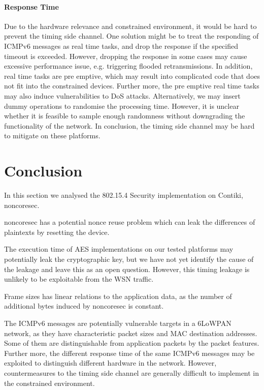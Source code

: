 \paragraph{Response Time}

Due to the hardware relevance and constrained environment, it would be hard to prevent the timing side channel. One solution might be to treat the responding of ICMPv6 messages as real time tasks, and drop the response if the specified timeout is exceeded. However, dropping the response in some cases may cause excessive performance issue, e.g. triggering flooded retransmissions. In addition, real time tasks are pre emptive, which may result into complicated code that does not fit into the constrained devices. Further more, the pre emptive real time tasks may also induce vulnerabilities to DoS attacks. Alternatively, we may insert dummy operations to randomise the processing time. However, it is unclear whether it is feasible to sample enough randomness without downgrading the functionality of the network. In conclusion, the timing side channel may be hard to mitigate on these platforms.


\section{Conclusion}

In this section we analysed the 802.15.4 Security implementation on Contiki, noncoresec.

noncoresec has a potential nonce reuse problem which can leak the differences of plaintexts by resetting the device.

The execution time of AES implementations on our tested platforms may potentially leak the cryptographic key, but we have not yet identify the cause of the leakage and leave this as an open question. However, this timing leakage is unlikely to be exploitable from the WSN traffic.

Frame sizes has linear relations to the application data, as the number of additional bytes induced by noncoresec is constant.

The ICMPv6 messages are potentially vulnerable targets in a 6LoWPAN network, as they have characteristic packet sizes and MAC destination addresses. Some of them are distinguishable from application packets by the packet features. Further more, the different response time of the same ICMPv6 messages may be exploited to distinguish different hardware in the network. However, countermeasures to the timing side channel are generally difficult to implement in the constrained environment.
